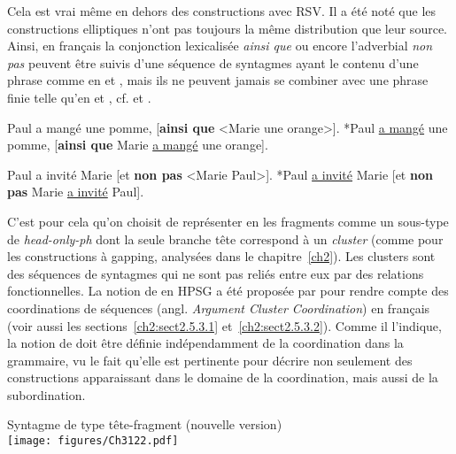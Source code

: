 Cela est vrai même en dehors des constructions avec RSV. Il a été noté que les constructions elliptiques n’ont pas toujours la même distribution que leur source. Ainsi, en français la conjonction lexicalisée \textit{ainsi que} ou encore l’adverbial \textit{non pas} peuvent être suivis d’une séquence de syntagmes ayant le contenu d’une phrase comme en  et , mais ils ne peuvent jamais se combiner avec une phrase finie telle qu'en  et , cf. \citet{AbeilleEtAl1996} et \citet{Mouret2006,Mouret2007,Mouret2008}.

\ea \label{ch3:ex120}
 
\ea 
Paul a mangé une pomme, [\textbf{ainsi que} <Marie une orange>]. \label{ch3:ex120a} 
\ex
*Paul \uline{a mangé} une pomme, [\textbf{ainsi que} Marie \uline{a mangé} une orange]. \label{ch3:ex120b}
\z 
\z 

\ea \label{ch3:ex121}

\ea 
Paul a invité Marie [et \textbf{non pas} <Marie Paul>]. \label{ch3:ex121a} 
\ex
*Paul \uline{a invité} Marie [et \textbf{non pas} Marie \uline{a invité} Paul]. \label{ch3:ex121b}
\z 
\z

C’est pour cela qu’on choisit de représenter en  les fragments comme un sous-type de \textit{head-only-ph} dont la seule branche tête correspond à un \textit{cluster} (comme pour les constructions à gapping, analysées dans le chapitre~\ref{ch2}). Les clusters sont des séquences de syntagmes qui ne sont pas reliés entre eux par des relations fonctionnelles. La notion de  en HPSG a été proposée par \citet{Mouret2006,Mouret2007} pour rendre compte des coordinations de séquences (angl. \textit{Argument Cluster Coordination}) en français (voir aussi les sections~\ref{ch2:sect2.5.3.1} et~\ref{ch2:sect2.5.3.2}). Comme il l’indique, la notion de  doit être définie indépendamment de la coordination dans la grammaire, vu le fait qu’elle est pertinente pour décrire non seulement des constructions apparaissant dans le domaine de la coordination, mais aussi de la subordination.

\ea \label{ch3:ex122}
Syntagme de type tête-fragment (nouvelle version)\\
\texttt{[image: figures/Ch3122.pdf]}


